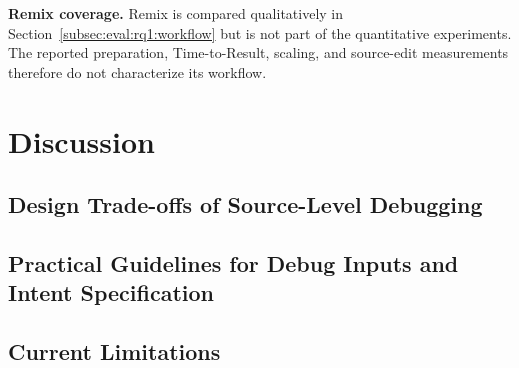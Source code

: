 \documentclass[11pt,oneside]{report}
\theoremstyle{plain}
\theoremstyle{definition}
\theoremstyle{remark}
\begin{document}
\smallskip
\noindent\textbf{Remix coverage.}
Remix is compared qualitatively in Section~\ref{subsec:eval:rq1:workflow} but
is not part of the quantitative experiments. The reported preparation,
Time-to-Result, scaling, and source-edit measurements therefore do not
characterize its workflow.


\chapter{Discussion}\label{chap:discussion}

\section{Design Trade-offs of Source-Level Debugging}\label{sec:disc:tradeoffs}

\section{Practical Guidelines for Debug Inputs and Intent Specification}\label{sec:disc:guidelines}

\section{Current Limitations}\label{sec:disc:limitations}
\end{document}

